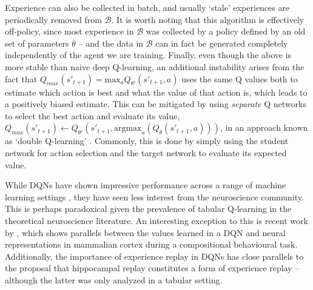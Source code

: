 Experience can also be collected in batch, and usually `stale' experiences are periodically removed from $\mathcal{B}$.
It is worth noting that this algorithm is effectively off-policy, since most experience in $\mathcal{B}$ was collected by a policy defined by an old set of parameters $\theta$ -- and the data in $\mathcal{B}$ can in fact be generated completely independently of the agent we are training.
Finally, even though the above is more stable than naive deep Q-learning, an additional instability arises from the fact that $Q_{max}(s'_{t+1}) = \text{max}_a Q_{\theta'}(s'_{t+1}, a)$ uses the same Q values both to estimate which action is best and what the value of that action is, which leads to a positively biased estimate.
This can be mitigated by using \emph{separate} Q networks to select the best action and evaluate its value, $Q_{max}(s'_{t+1}) \leftarrow Q_{\theta'}(s'_{t+1}, \text{argmax}_a(Q_{\theta}(s'_{t+1}, a)))$, in an approach known as `double Q-learning' \citep{van2016deep}.
Commonly, this is done by simply using the student network for action selection and the target network to evaluate its expected value.

While DQNs have shown impressive performance across a range of machine learning settings \citep{mnih2013playing, lillicrap2015continuous, schaul2015prioritized, kalashnikov2018qt}, they have seen less interest from the neuroscience community.
This is perhaps paradoxical given the prevalence of tabular Q-learning in the theoretical neuroscience literature.
An interesting exception to this is recent work by \citet{makino2023arithmetic}, which shows parallels between the values learned in a DQN and neural  representations in mammalian cortex during a compositional behavioural task.
Additionally, the importance of experience replay in DQNs \citep{mnih2013playing, schaul2015prioritized} has close parallels to the proposal that hippocampal replay constitutes a form of experience replay \citep{mattar2018prioritized} -- although the latter was only analyzed in a tabular setting.

